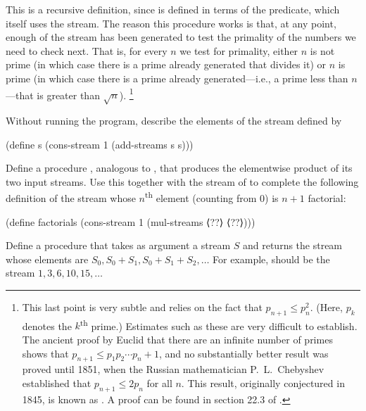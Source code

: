 This is a recursive definition, since  is defined in terms of the  predicate, which itself uses the  stream.
The reason this procedure works is that, at any point, enough of the  stream has been generated to test the primality of the numbers we need to check next.
That is, for every \( n \) we test for primality, either \( n \) is not prime (in which case there is a prime already generated that divides it) or \( n \) is prime (in which case there is a prime already generated---i.e., a prime less than \( n \)---that is greater than \( \sqrt{n} \)).%
\footnote{
	This last point is very subtle and relies on the fact that \( p_{n+1} ≤ p_n^2 \).
	(Here, \( p_k \) denotes the \( k \)\textsuperscript{th} prime.)
	Estimates such as these are very difficult to establish.
	The ancient proof by Euclid that there are an infinite number of primes shows that \( p_{n+1} ≤ p_1 p_2 \dotsm p_n + 1 \), and no substantially better result was proved until 1851, when the Russian mathematician P.~L.~Chebyshev established that \( p_{n+1} ≤ 2 p_n \) for all \( n \).
	This result, originally conjectured in 1845, is known as .
	A proof can be found in section 22.3 of .
}



\begin{exercise}
	\label{Exercise 3.53}
	Without running the program, describe the elements of the stream defined by 
	\begin{scheme}
	  (define s (cons-stream 1 (add-streams s s)))
	\end{scheme}
\end{exercise}



\begin{exercise}
	\label{Exercise 3.54}
	Define a procedure , analogous to , that produces the elementwise product of its two input streams.
	Use this together with the stream of  to complete the following definition of the stream whose \( n \)\textsuperscript{th} element (counting from \( 0 \)) is \( n + 1 \) factorial:
	\begin{scheme}
	  (define factorials
	    (cons-stream 1 (mul-streams ⟨??⟩ ⟨??⟩)))
	\end{scheme}
\end{exercise}



\begin{exercise}
	\label{Exercise 3.55}
	Define a procedure  that takes as argument a stream \( S \) and returns the stream whose elements are \( S_0, S_0 + S_1, S_0 + S_1 + S_2, \dotsc \)
	For example,  should be the stream \( 1, 3, 6, 10, 15, \dotsc \)
\end{exercise}



